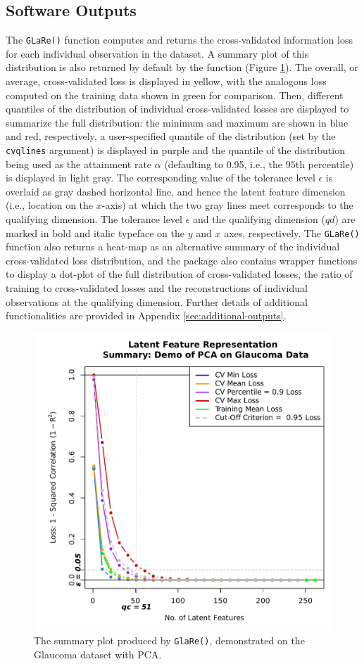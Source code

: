 \subsection{Software Outputs}

The \texttt{GLaRe()} function computes and returns the cross-validated information loss for each individual observation in the dataset.
A summary plot of this distribution is also returned by default by the function (Figure \ref{fig:glare-anatomy-plot}).
The overall, or average, cross-validated loss is displayed in yellow, with the analogous loss computed on the training data shown in green for comparison.
Then, different quantiles of the distribution of individual cross-validated losses are displayed to summarize the full distribution: the minimum and maximum are shown in blue and red, respectively, a user-specified quantile of the distribution (set by the \texttt{cvqlines} argument) is displayed in purple and the quantile of the distribution being used as the attainment rate $\alpha$ (defaulting to 0.95, i.e., the $95$th percentile) is displayed in light gray.
The corresponding value of the tolerance level $\epsilon$ is overlaid as gray dashed horizontal line, and hence the latent feature dimension (i.e., location on the $x$-axis) at which the two gray lines meet corresponds to the qualifying dimension.
The tolerance level $\epsilon$ and the qualifying dimension ($qd$) are marked in bold and italic typeface on the $y$ and $x$ axes, respectively.
The \texttt{GLaRe()} function also returns a heat-map as an alternative summary of the individual cross-validated loss distribution, and the package also contains wrapper functions to display a dot-plot of the full distribution of cross-validated losses, the ratio of training to cross-validated losses and the reconstructions of individual observations at the qualifying dimension. 
Further details of additional functionalities are provided in Appendix \ref{sec:additional-outputs}.

\begin{figure}
    \centering
    \includegraphics[width=0.5\linewidth]{figures/glare-anatomy-plot.pdf}
    \caption{The summary plot produced by \texttt{GlaRe()}, demonstrated on the Glaucoma dataset with PCA.}
    \label{fig:glare-anatomy-plot}
\end{figure}